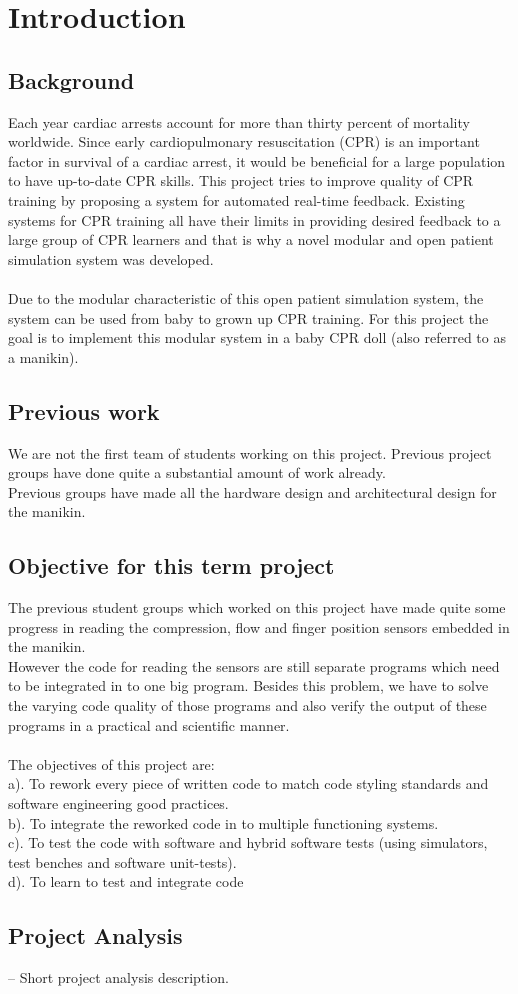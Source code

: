 \chapter{Introduction}
\label{chapter:intro}

\section{Background}
Each year cardiac arrests account for more than thirty percent of mortality worldwide. Since
early cardiopulmonary resuscitation (CPR) is an important factor in survival of a cardiac arrest,
it would be beneficial for a large population to have up-to-date CPR skills. This project tries to
improve quality of CPR training by proposing a system for automated real-time feedback.
Existing systems for CPR training all have their limits in providing desired feedback to a large
group of CPR learners and that is why a novel modular and open patient simulation system was
developed. \cite{jakortenmsc}\\\\
Due to the modular characteristic of this open patient simulation system, the system can be used from baby to grown up CPR training. 
For this project the goal is to implement this modular system in a baby CPR doll (also referred to as a manikin).\\
\section{Previous work}
We are not the first team of students working on this project. Previous project groups have done quite a substantial amount of work already. \\
Previous groups have made all the hardware design and architectural design for the manikin.\\ 
\section{Objective for this term project}
The previous student groups which worked on this project have made quite some progress in reading the compression, flow and finger position sensors embedded in the manikin.
\\However the code for reading the sensors are still separate programs which need to be integrated in to one big program. Besides this problem, we have to solve the varying code quality of those programs and also verify the output of these programs in a practical and scientific manner.\\\\
The objectives of this project are:\\
a). To rework every piece of written code to match code styling standards and software engineering good practices.\\
b). To integrate the reworked code in to multiple functioning systems.\\
c). To test the code with software and hybrid software tests (using simulators, test benches and software unit-tests).\\
d). To learn to test and integrate code \\

\section {Project Analysis}
 -- Short project analysis description.

